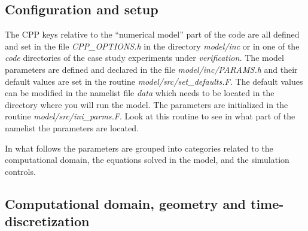 \subsection{Configuration and setup}

The CPP keys relative to the ``numerical model'' part of the code are
all defined and set in the file \textit{CPP\_OPTIONS.h }in the
directory \textit{ model/inc }or in one of the \textit{code
}directories of the case study experiments under
\textit{verification.} The model parameters are defined and declared
in the file \textit{model/inc/PARAMS.h }and their default values are
set in the routine \textit{model/src/set\_defaults.F. }The default
values can be modified in the namelist file \textit{data }which needs
to be located in the directory where you will run the model. The
parameters are initialized in the routine
\textit{model/src/ini\_parms.F}.  Look at this routine to see in what
part of the namelist the parameters are located.

In what follows the parameters are grouped into categories related to
the computational domain, the equations solved in the model, and the
simulation controls.

\subsection{Computational domain, geometry and time-discretization}

